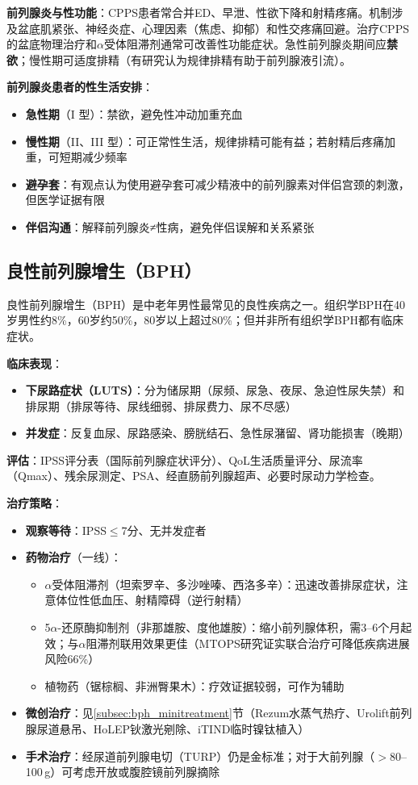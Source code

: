 \textbf{前列腺炎与性功能}：CPPS患者常合并ED、早泄、性欲下降和射精疼痛。机制涉及盆底肌紧张、神经炎症、心理因素（焦虑、抑郁）和性交疼痛回避。治疗CPPS的盆底物理治疗和$\alpha$受体阻滞剂通常可改善性功能症状。急性前列腺炎期间应\textbf{禁欲}；慢性期可适度排精（有研究认为规律排精有助于前列腺液引流）。

\textbf{前列腺炎患者的性生活安排}：
\begin{itemize}[leftmargin=2cm]
	\item \textbf{急性期}（I 型）：禁欲，避免性冲动加重充血
	\item \textbf{慢性期}（II、III 型）：可正常性生活，规律排精可能有益；若射精后疼痛加重，可短期减少频率
	\item \textbf{避孕套}：有观点认为使用避孕套可减少精液中的前列腺素对伴侣宫颈的刺激，但医学证据有限
	\item \textbf{伴侣沟通}：解释前列腺炎≠性病，避免伴侣误解和关系紧张
\end{itemize}

\subsection{良性前列腺增生（BPH）}

良性前列腺增生（BPH）是中老年男性最常见的良性疾病之一。组织学BPH在40岁男性约8\%，60岁约50\%，80岁以上超过80\%；但并非所有组织学BPH都有临床症状。

\textbf{临床表现}：
\begin{itemize}[leftmargin=2cm]
	\item \textbf{下尿路症状（LUTS）}：分为储尿期（尿频、尿急、夜尿、急迫性尿失禁）和排尿期（排尿等待、尿线细弱、排尿费力、尿不尽感）
	\item \textbf{并发症}：反复血尿、尿路感染、膀胱结石、急性尿潴留、肾功能损害（晚期）
\end{itemize}

\textbf{评估}：IPSS评分表（国际前列腺症状评分）、QoL生活质量评分、尿流率（Qmax）、残余尿测定、PSA、经直肠前列腺超声、必要时尿动力学检查。

\textbf{治疗策略}：
\begin{itemize}[leftmargin=2cm]
	\item \textbf{观察等待}：IPSS$\le$7分、无并发症者
	\item \textbf{药物治疗}（一线）：
    \begin{itemize}
    	\item $\alpha$受体阻滞剂（坦索罗辛、多沙唑嗪、西洛多辛）：迅速改善排尿症状，注意体位性低血压、射精障碍（逆行射精）
    	\item 5$\alpha$-还原酶抑制剂（非那雄胺、度他雄胺）：缩小前列腺体积，需3--6个月起效；与$\alpha$阻滞剂联用效果更佳（MTOPS研究证实联合治疗可降低疾病进展风险66\%）
    	\item 植物药（锯棕榈、非洲臀果木）：疗效证据较弱，可作为辅助
    \end{itemize}
	\item \textbf{微创治疗}：见\ref{subsec:bph_minitreatment}节（Rezum水蒸气热疗、Urolift前列腺尿道悬吊、HoLEP钬激光剜除、iTIND临时镍钛植入）
	\item \textbf{手术治疗}：经尿道前列腺电切（TURP）仍是金标准；对于大前列腺（$>$80--100\,g）可考虑开放或腹腔镜前列腺摘除
\end{itemize}

